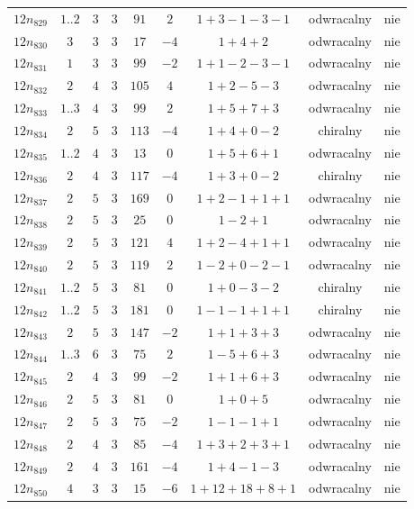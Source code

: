 \begin{longtable}{ccccccccc}
$12n_{829}$ & $1..2$ & $3$ & $3$ & $91$ & $2$ & $1+3-1-3-1$ & odwracalny & nie \\
$12n_{830}$ & $3$ & $3$ & $3$ & $17$ & $-4$ & $1+4+2$ & odwracalny & nie \\
$12n_{831}$ & $1$ & $3$ & $3$ & $99$ & $-2$ & $1+1-2-3-1$ & odwracalny & nie \\
$12n_{832}$ & $2$ & $4$ & $3$ & $105$ & $4$ & $1+2-5-3$ & odwracalny & nie \\
$12n_{833}$ & $1..3$ & $4$ & $3$ & $99$ & $2$ & $1+5+7+3$ & odwracalny & nie \\
$12n_{834}$ & $2$ & $5$ & $3$ & $113$ & $-4$ & $1+4+0-2$ & chiralny & nie \\
$12n_{835}$ & $1..2$ & $4$ & $3$ & $13$ & $0$ & $1+5+6+1$ & odwracalny & nie \\
$12n_{836}$ & $2$ & $4$ & $3$ & $117$ & $-4$ & $1+3+0-2$ & chiralny & nie \\
$12n_{837}$ & $2$ & $5$ & $3$ & $169$ & $0$ & $1+2-1+1+1$ & odwracalny & nie \\
$12n_{838}$ & $2$ & $5$ & $3$ & $25$ & $0$ & $1-2+1$ & odwracalny & nie \\
$12n_{839}$ & $2$ & $5$ & $3$ & $121$ & $4$ & $1+2-4+1+1$ & odwracalny & nie \\
$12n_{840}$ & $2$ & $5$ & $3$ & $119$ & $2$ & $1-2+0-2-1$ & odwracalny & nie \\
$12n_{841}$ & $1..2$ & $5$ & $3$ & $81$ & $0$ & $1+0-3-2$ & chiralny & nie \\
$12n_{842}$ & $1..2$ & $5$ & $3$ & $181$ & $0$ & $1-1-1+1+1$ & chiralny & nie \\
$12n_{843}$ & $2$ & $5$ & $3$ & $147$ & $-2$ & $1+1+3+3$ & odwracalny & nie \\
$12n_{844}$ & $1..3$ & $6$ & $3$ & $75$ & $2$ & $1-5+6+3$ & odwracalny & nie \\
$12n_{845}$ & $2$ & $4$ & $3$ & $99$ & $-2$ & $1+1+6+3$ & odwracalny & nie \\
$12n_{846}$ & $2$ & $5$ & $3$ & $81$ & $0$ & $1+0+5$ & odwracalny & nie \\
$12n_{847}$ & $2$ & $5$ & $3$ & $75$ & $-2$ & $1-1-1+1$ & odwracalny & nie \\
$12n_{848}$ & $2$ & $4$ & $3$ & $85$ & $-4$ & $1+3+2+3+1$ & odwracalny & nie \\
$12n_{849}$ & $2$ & $4$ & $3$ & $161$ & $-4$ & $1+4-1-3$ & odwracalny & nie \\
$12n_{850}$ & $4$ & $3$ & $3$ & $15$ & $-6$ & $1+12+18+8+1$ & odwracalny & nie \\

\end{longtable}
